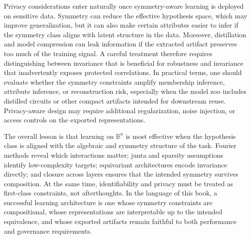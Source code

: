 \documentclass[11pt]{article}
\begin{document}
Privacy considerations enter naturally once symmetry-aware learning is deployed on sensitive data. Symmetry can reduce the effective hypothesis space, which may improve generalization, but it can also make certain attributes easier to infer if the symmetry class aligns with latent structure in the data. Moreover, distillation and model compression can leak information if the extracted artifact preserves too much of the training signal. A careful treatment therefore requires distinguishing between invariance that is beneficial for robustness and invariance that inadvertently exposes protected correlations. In practical terms, one should evaluate whether the symmetry constraints amplify membership inference, attribute inference, or reconstruction risk, especially when the model zoo includes distilled circuits or other compact artifacts intended for downstream reuse. Privacy-aware design may require additional regularization, noise injection, or access controls on the exported representations.

The overall lesson is that learning on \(\mathbb{B}^n\) is most effective when the hypothesis class is aligned with the algebraic and symmetry structure of the task. Fourier methods reveal which interactions matter; junta and sparsity assumptions identify low-complexity targets; equivariant architectures encode invariance directly; and closure across layers ensures that the intended symmetry survives composition. At the same time, identifiability and privacy must be treated as first-class constraints, not afterthoughts. In the language of this book, a successful learning architecture is one whose symmetry constraints are compositional, whose representations are interpretable up to the intended equivalence, and whose exported artifacts remain faithful to both performance and governance requirements.
\end{document}
